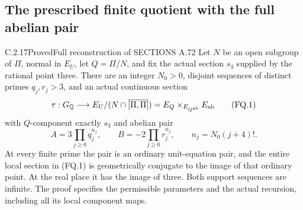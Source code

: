\subsection{The prescribed finite quotient with the full abelian pair}

\begin{result}{C.2.17}{Proved}{Full reconstruction of SECTIONS A.72}
\label{thm:ghost-finite-quotient-survival}
Let \(N\) be an open subgroup of \(\Pi\), normal in
\(E_U\), let \(Q=\Pi/N\), and fix the actual section
\(s_3\) supplied by the rational point three.
There are an integer \(N_0>0\), disjoint sequences of
distinct primes \(q_j,r_j>3\), and an actual continuous
section
\[
 \tau:G_{\mathbb Q}\longrightarrow
 E_U/(N\cap\overline{[\Pi,\Pi]})
   =E_Q\mathbin{\times}_{E_{Q^{\rm ab}}}E_{\rm ab}
 \tag{FQ.1}
\]
with \(Q\)-component exactly \(s_3\) and abelian pair
\[
 A=3\prod_{j\ge0}q_j^{n_j},\qquad
 B=-2\prod_{j\ge0}r_j^{n_j},\qquad
 n_j=N_0(j+4)!.
 \tag{FQ.2}
\]
At every finite prime the pair is an ordinary
unit-equation pair, and the entire local section
in (FQ.1) is geometrically conjugate to the image
of that ordinary point. At the real place it has
the image of three. Both support sequences are
infinite. The proof specifies the permissible
parameters and the actual recursion, including
all its local component maps.
\end{result}
